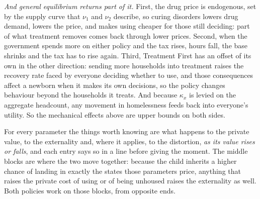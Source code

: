 \documentclass[10pt]{article}
\begin{document}
\emph{And general equilibrium returns part of it.} First, the drug price is
endogenous, set by the supply curve that $\nu_1$ and $\nu_2$ describe, so curing
disorders lowers drug demand, lowers the price, and makes using cheaper for those
still deciding: part of what treatment removes comes back through
lower prices. Second, when the government spends more on
either policy and the tax rises, hours fall, the base
shrinks and the tax has to rise again. Third, Treatment First has an offset of
its own in the other direction: sending more households into treatment raises the
recovery rate faced by everyone deciding whether to use, and those
consequences affect a newborn when it makes its own decisions, so the policy
changes behaviour beyond the households it treats. And because $\kappa_x$ is levied on the
aggregate headcount, any movement in homelessness feeds back into everyone's
utility. So the mechanical effects above are upper bounds on both sides.

\medskip

\noindent For every parameter the things worth knowing are what
happens to the private value, to the externality and, where it applies, to the
distortion, \emph{as its value rises or falls}, and each entry says so in a line before giving the
moment. The middle blocks are where the two move
together: because the child inherits a higher chance of landing in exactly the
states those parameters price, anything that raises the private cost of using or of
being unhoused raises the externality as well. Both policies work on those blocks,
from opposite ends.


\end{document}
